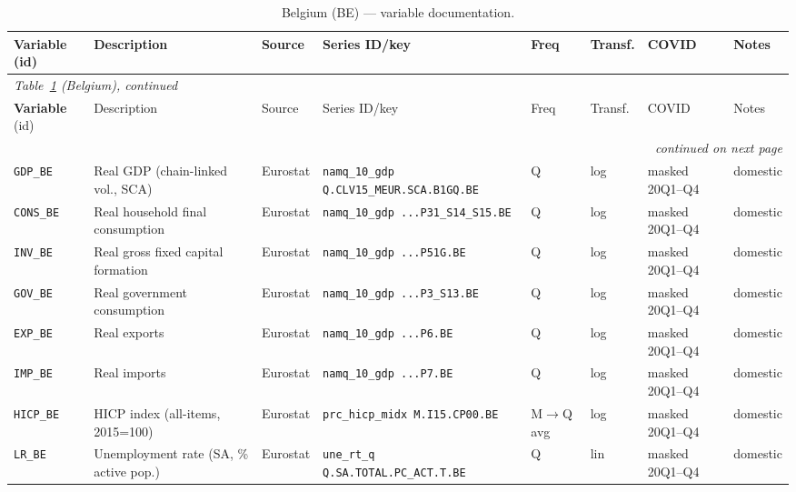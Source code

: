 \begin{longtable}{@{}p{}p{}p{}p{}p{}p{}p{}p{}@{}}
\caption{Belgium (BE) --- variable documentation.}\label{tab:data:BE}\\
\toprule
\textbf{Variable} (id) & Description & Source & Series ID/key & Freq & Transf. & COVID & Notes \\
\midrule
\endfirsthead
\multicolumn{8}{l}{\small\itshape Table~\ref{tab:data:BE} (Belgium), continued}\\
\toprule
\textbf{Variable} (id) & Description & Source & Series ID/key & Freq & Transf. & COVID & Notes \\
\midrule
\endhead
\midrule \multicolumn{8}{r}{\small\itshape continued on next page}\\
\endfoot
\bottomrule
\endlastfoot
\texttt{GDP\_BE}    & Real GDP (chain-linked vol., SCA) & Eurostat & \texttt{namq\_10\_gdp Q.\allowbreak CLV15\_MEUR.\allowbreak SCA.\allowbreak B1GQ.\allowbreak BE} & Q & log & masked 20Q1--Q4 & domestic \\
\texttt{CONS\_BE}   & Real household final consumption & Eurostat & \texttt{namq\_10\_gdp ...\allowbreak P31\_S14\_S15.\allowbreak BE} & Q & log & masked 20Q1--Q4 & domestic \\
\texttt{INV\_BE}    & Real gross fixed capital formation & Eurostat & \texttt{namq\_10\_gdp ...\allowbreak P51G.\allowbreak BE} & Q & log & masked 20Q1--Q4 & domestic \\
\texttt{GOV\_BE}    & Real government consumption & Eurostat & \texttt{namq\_10\_gdp ...\allowbreak P3\_S13.\allowbreak BE} & Q & log & masked 20Q1--Q4 & domestic \\
\texttt{EXP\_BE}    & Real exports & Eurostat & \texttt{namq\_10\_gdp ...\allowbreak P6.\allowbreak BE} & Q & log & masked 20Q1--Q4 & domestic \\
\texttt{IMP\_BE}    & Real imports & Eurostat & \texttt{namq\_10\_gdp ...\allowbreak P7.\allowbreak BE} & Q & log & masked 20Q1--Q4 & domestic \\
\texttt{HICP\_BE}   & HICP index (all-items, 2015=100) & Eurostat & \texttt{prc\_hicp\_midx M.\allowbreak I15.\allowbreak CP00.\allowbreak BE} & M$\to$Q avg & log & masked 20Q1--Q4 & domestic \\
\texttt{LR\_BE}     & Unemployment rate (SA, \% active pop.) & Eurostat & \texttt{une\_rt\_q Q.\allowbreak SA.\allowbreak TOTAL.\allowbreak PC\_ACT.\allowbreak T.\allowbreak BE} & Q & lin & masked 20Q1--Q4 & domestic \\

\end{longtable}
